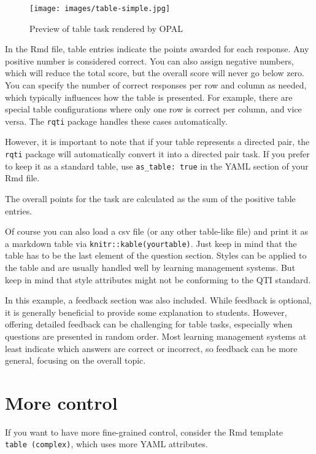 \documentclass[twoside]{tufte-book}
\begin{document}
\begin{figure}
\centering
\texttt{[image: images/table-simple.jpg]}
\caption{\label{tbl1opal}Preview of table task rendered by OPAL}
\end{figure}

In the Rmd file, table entries indicate the points awarded for each response. Any positive number is considered correct. You can also assign negative numbers, which will reduce the total score, but the overall score will never go below zero. You can specify the number of correct responses per row and column as needed, which typically influences how the table is presented. For example, there are special table configurations where only one row is correct per column, and vice versa. The \texttt{rqti} package handles these cases automatically.

However, it is important to note that if your table represents a directed pair, the \texttt{rqti} package will automatically convert it into a directed pair task. If you prefer to keep it as a standard table, use \texttt{as\_table:\ true} in the YAML section of your Rmd file.

The overall points for the task are calculated as the sum of the positive table entries.

Of course you can also load a csv file (or any other table-like file) and print it as a markdown table via \texttt{knitr::kable(yourtable)}. Just keep in mind that the table has to be the last element of the question section. Styles can be applied to the table and are usually handled well by learning management systems. But keep in mind that style attributes might not be conforming to the QTI standard.

In this example, a feedback section was also included. While feedback is optional, it is generally beneficial to provide some explanation to students. However, offering detailed feedback can be challenging for table tasks, especially when questions are presented in random order. Most learning management systems at least indicate which answers are correct or incorrect, so feedback can be more general, focusing on the overall topic.

\section{More control}\label{more-control-7}

If you want to have more fine-grained control, consider the Rmd template \texttt{table\ (complex)}, which uses more YAML attributes.
\end{document}
